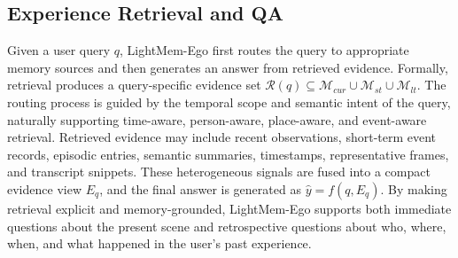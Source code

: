 \subsection{Experience Retrieval and QA}

Given a user query \(q\), LightMem-Ego first routes the query to appropriate memory sources and then generates an answer from retrieved evidence. 
Formally, retrieval produces a query-specific evidence set \(\mathcal{R}(q)\subseteq \mathcal{M}_{cur}\cup\mathcal{M}_{st}\cup\mathcal{M}_{lt}\). 
The routing process is guided by the temporal scope and semantic intent of the query, naturally supporting time-aware, person-aware, place-aware, and event-aware retrieval. Retrieved evidence may include recent observations, short-term event records, episodic entries, semantic summaries, timestamps, representative frames, and transcript snippets.
These heterogeneous signals are fused into a compact evidence view \(E_q\), and the final answer is generated as \(\hat{y}=f(q,E_q)\). 
By making retrieval explicit and memory-grounded, LightMem-Ego supports both immediate questions about the present scene and retrospective questions about who, where, when, and what happened in the user’s past experience.